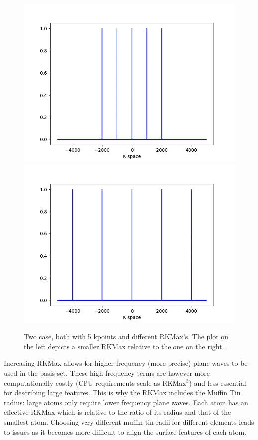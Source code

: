 \documentclass[12pt]{article}
\begin{document}
\begin{figure}[H]
	\includegraphics[scale=0.5]{./images/low_rkmax.png}
	\includegraphics[scale=0.5]{./images/high_rkmax.png}	\caption*{Two case, both with 5 kpoints and different RKMax's.  The plot on the left depicts a smaller RKMax relative to the one on the right.}
\end{figure}


Increasing RKMax allows for higher frequency (more precise) plane waves to be used in the basis set.  These high frequency terms are however more computationally costly (CPU requirements scale as RKMax$^3$) and less essential for describing large features. This is why the RKMax includes the Muffin Tin radius: large atoms only require lower frequency plane waves.  Each atom has an effective RKMax which  is relative to the ratio of its radius and that of the smallest atom.  Choosing very different muffin tin radii for different elements leads to issues as it becomes more difficult to align the surface features of each atom.  \\
\end{document}
